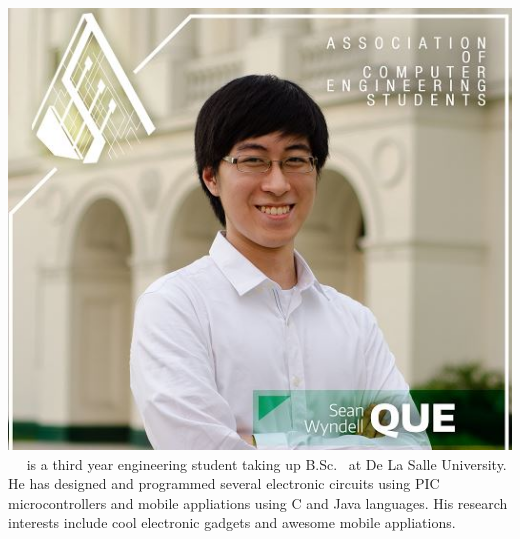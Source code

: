 \includegraphics[width=0.2\columnwidth]{author4}
 \  \ is a third year engineering student taking up B.Sc. \degree \ at De La Salle University. He has designed and programmed several electronic circuits using PIC microcontrollers and mobile appliations using C and Java languages. His research interests include cool electronic gadgets and awesome mobile appliations.

\vfill
